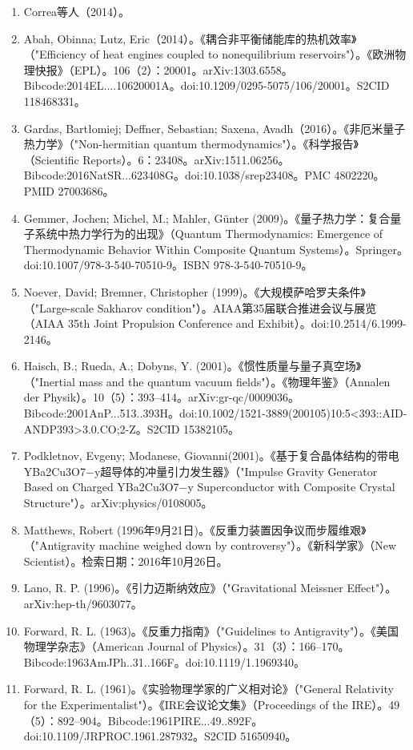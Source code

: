 \begin{enumerate}
\item Correa等人（2014）。
\item Abah, Obinna; Lutz, Eric（2014）。《耦合非平衡储能库的热机效率》（"Efficiency of heat engines coupled to nonequilibrium reservoirs"）。《欧洲物理快报》（EPL）。106（2）：20001。arXiv:1303.6558。Bibcode:2014EL....10620001A。doi:10.1209/0295-5075/106/20001。S2CID 118468331。
\item Gardas, Bartłomiej; Deffner, Sebastian; Saxena, Avadh（2016）。《非厄米量子热力学》（"Non-hermitian quantum thermodynamics"）。《科学报告》（Scientific Reports）。6：23408。arXiv:1511.06256。Bibcode:2016NatSR...623408G。doi:10.1038/srep23408。PMC 4802220。PMID 27003686。
\item Gemmer, Jochen; Michel, M.; Mahler, Günter (2009)。《量子热力学：复合量子系统中热力学行为的出现》（Quantum Thermodynamics: Emergence of Thermodynamic Behavior Within Composite Quantum Systems）。Springer。doi:10.1007/978-3-540-70510-9。ISBN 978-3-540-70510-9。
\item Noever, David; Bremner, Christopher (1999)。《大规模萨哈罗夫条件》（"Large-scale Sakharov condition"）。AIAA第35届联合推进会议与展览（AIAA 35th Joint Propulsion Conference and Exhibit）。doi:10.2514/6.1999-2146。
\item Haisch, B.; Rueda, A.; Dobyns, Y. (2001)。《惯性质量与量子真空场》（"Inertial mass and the quantum vacuum fields"）。《物理年鉴》（Annalen der Physik）。10（5）：393–414。arXiv:gr-qc/0009036。Bibcode:2001AnP...513..393H。doi:10.1002/1521-3889(200105)10:5<393::AID-ANDP393>3.0.CO;2-Z。S2CID 15382105。
\item Podkletnov, Evgeny; Modanese, Giovanni(2001)。《基于复合晶体结构的带电YBa2Cu3O7−y超导体的冲量引力发生器》（"Impulse Gravity Generator Based on Charged YBa2Cu3O7−y Superconductor with Composite Crystal Structure"）。arXiv:physics/0108005。
\item Matthews, Robert (1996年9月21日)。《反重力装置因争议而步履维艰》（"Antigravity machine weighed down by controversy"）。《新科学家》（New Scientist）。检索日期：2016年10月26日。
\item Lano, R. P. (1996)。《引力迈斯纳效应》（"Gravitational Meissner Effect"）。arXiv:hep-th/9603077。
\item Forward, R. L. (1963)。《反重力指南》（"Guidelines to Antigravity"）。《美国物理学杂志》（American Journal of Physics）。31（3）：166–170。Bibcode:1963AmJPh..31..166F。doi:10.1119/1.1969340。
\item Forward, R. L. (1961)。《实验物理学家的广义相对论》（"General Relativity for the Experimentalist"）。《IRE会议论文集》（Proceedings of the IRE）。49（5）：892–904。Bibcode:1961PIRE...49..892F。doi:10.1109/JRPROC.1961.287932。S2CID 51650940。

\end{enumerate}
